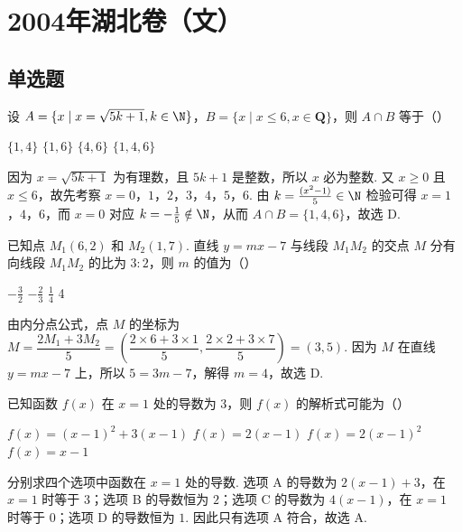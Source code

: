 \chapter{2004年湖北卷（文）}
\section{单选题}
\begin{problem}
设 \(A=\{x\mid x=\sqrt{5k+1}, k\in\N\}\)，\(B=\{x\mid x\leqslant 6, x\in\mathbf{Q}\}\)，则 \(A\cap B\) 等于（\quad）

\choices
    {\(\{1,4\}\)}
    {\(\{1,6\}\)}
    {\(\{4,6\}\)}
    {\(\{1,4,6\}\)}
\end{problem}

\begin{solution}
因为 \(x=\sqrt{5k+1}\) 为有理数，且 \(5k+1\) 是整数，所以 \(x\) 必为整数. 又 \(x\geqslant0\) 且 \(x\leqslant6\)，故先考察 \(x=0\)，\(1\)，\(2\)，\(3\)，\(4\)，\(5\)，\(6\). 由 \(k=\frac{(x^2-1)}{5}\in\N\) 检验可得 \(x=1\)，\(4\)，\(6\)，而 \(x=0\) 对应 \(k=-\frac15\notin\N\)，从而 \(A\cap B=\{1,4,6\}\)，故选 D.
\end{solution}

\begin{problem}
已知点 \(M_1\left(6,2\right)\) 和 \(M_2\left(1,7\right)\). 直线 \(y=mx-7\) 与线段 \(M_1M_2\) 的交点 \(M\) 分有向线段 \(M_1M_2\) 的比为 \(3:2\)，则 \(m\) 的值为（\quad）

\choices
    {\(-\frac{3}{2}\)}
    {\(-\frac{2}{3}\)}
    {\(\frac{1}{4}\)}
    {4}
\end{problem}

\begin{solution}
由内分点公式，点 \(M\) 的坐标为
\(M=\dfrac{2M_1+3M_2}{5}=\left(\dfrac{2\times6+3\times1}{5},\dfrac{2\times2+3\times7}{5}\right)=\left(3,5\right)\).
因为 \(M\) 在直线 \(y=mx-7\) 上，所以 \(5=3m-7\)，解得 \(m=4\)，故选 D.
\end{solution}

\begin{problem}
已知函数 \(f(x)\) 在 \(x=1\) 处的导数为 3，则 \(f(x)\) 的解析式可能为（\quad）

\choices
    {\(f(x)=\left(x-1\right)^2+3\left(x-1\right)\)}
    {\(f(x)=2\left(x-1\right)\)}
    {\(f(x)=2\left(x-1\right)^2\)}
    {\(f(x)=x-1\)}
\end{problem}

\begin{solution}
分别求四个选项中函数在 \(x=1\) 处的导数. 选项 A 的导数为 \(2\left(x-1\right)+3\)，在 \(x=1\) 时等于 \(3\)；选项 B 的导数恒为 \(2\)；选项 C 的导数为 \(4\left(x-1\right)\)，在 \(x=1\) 时等于 \(0\)；选项 D 的导数恒为 \(1\). 因此只有选项 A 符合，故选 A.
\end{solution}

